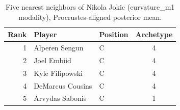 \begin{table}[htbp]
  \centering\small
  \begin{tabular}{rllc}
    \toprule
    Rank & Player & Position & Archetype \\
    \midrule
    1 & Alperen Sengun & C & 4 \\
    2 & Joel Embiid & C & 4 \\
    3 & Kyle Filipowski & C & 4 \\
    4 & DeMarcus Cousins & C & 4 \\
    5 & Arvydas Sabonis & C & 1 \\
    \bottomrule
  \end{tabular}
  \caption{Five nearest neighbors of Nikola Jokic (curvature_m1 modality), Procrustes-aligned posterior mean.}
  \label{tab:Nikola_Jokic_neighbors_curvature_m1}
\end{table}

